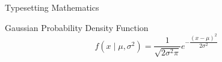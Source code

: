 \documentclass[\string~/GitHub/sthlmNordBeamerTheme/sthlmNordLightDemo.tex]{subfiles}
\begin{document}
\begin{frame}[fragile]{Typesetting Mathematics}
	\begin{block}{Gaussian Probability Density Function}
		\[
			f \left(x \mid \mu, \sigma^2 \right) = \dfrac{1}{\sqrt{2 \sigma^2 \pi}} e^{- \dfrac{(x-\mu)^2}{2\sigma^2}}
		\]
	\end{block}

\end{frame}
\end{document}
